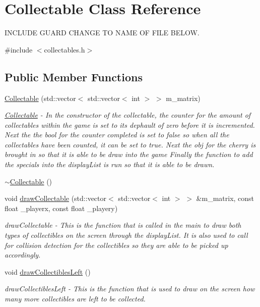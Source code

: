 \hypertarget{classCollectable}{
\section{Collectable Class Reference}
\label{classCollectable}
}


INCLUDE GUARD CHANGE TO NAME OF FILE BELOW.  


{\ttfamily \#include $<$collectables.h$>$}\subsection*{Public Member Functions}
\begin{DoxyCompactItemize}
\item 
\hyperlink{classCollectable_a95cb1ed37d494d716bb386942d434845}{Collectable} (std::vector$<$ std::vector$<$ int $>$ $>$ m\_\-matrix)
\begin{DoxyCompactList}\small\item\em \hyperlink{classCollectable}{Collectable} -\/ In the constructor of the collectable, the counter for the amount of collectables within the game is set to its dephault of zero before it is incremented. Next the the bool for the counter completed is set to false so when all the collectables have been counted, it can be set to true. Next the obj for the cherry is brought in so that it is able to be draw into the game Finally the function to add the specials into the displayList is run so that it is able to be drawn. \item\end{DoxyCompactList}\item 
\hyperlink{classCollectable_a420214e6656c670e88885b6f9716547b}{$\sim$Collectable} ()
\item 
void \hyperlink{classCollectable_ad807d275eeb43d6bdc7af1ac80f59175}{drawCollectable} (std::vector$<$ std::vector$<$ int $>$ $>$ \&m\_\-matrix, const float \_\-playerx, const float \_\-playery)
\begin{DoxyCompactList}\small\item\em drawCollectable -\/ This is the function that is called in the main to draw both types of collectibles on the screen through the displayList. It is also used to call for collision detection for the collectibles so they are able to be picked up accordingly. \item\end{DoxyCompactList}\item 
\hypertarget{classCollectable_ae7b2943d00138cd7b13c8c68a7e077c6}{
void \hyperlink{classCollectable_ae7b2943d00138cd7b13c8c68a7e077c6}{drawCollectiblesLeft} ()}
\label{classCollectable_ae7b2943d00138cd7b13c8c68a7e077c6}

\begin{DoxyCompactList}\small\item\em drawCollectiblesLeft -\/ This is the function that is used to draw on the screen how many more collectibles are left to be collected. \item\end{DoxyCompactList}\end{DoxyCompactItemize}
